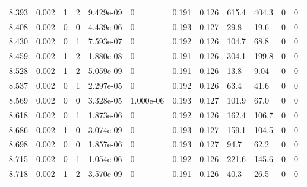 \documentclass[preview]{standalone}
\begin{document}
{{{{{{\begin{tabular}{L{1.2cm}C{1.2cm} C{0.3cm}C{0.5cm} C{1.4cm}C{1.4cm} C{1.4cm}C{1.4cm} C{1.6cm}C{1.6cm} C{1.6cm}C{1.6cm}}
  8.393  &  0.002  & 1     &  2 &  9.429e-09  & 0  &  0.191&   0.126& 615.4 & 404.3   &  0 & 0  \\ 
  8.408  &  0.002  & 0     &  0 &  4.439e-06  & 0  &  0.193&   0.127& 29.8 & 19.6   &  0 & 0  \\ 
  8.430  &  0.002  & 0     &  1 &  7.593e-07  & 0  &  0.192&   0.126& 104.7 & 68.8   &  0 & 0  \\ 
  8.459  &  0.002  & 1     &  2 &  1.880e-08  & 0  &  0.191&   0.126& 304.1 & 199.8   &  0 & 0  \\ 
  8.528  &  0.002  & 1     &  2 &  5.059e-09  & 0  &  0.191&   0.126& 13.8 & 9.04   &  0 & 0  \\ 
  8.537  &  0.002  & 0     &  1 &  2.297e-05  & 0  &  0.192&   0.126& 63.4 & 41.6   &  0 & 0  \\ 
  8.569  &  0.002  & 0     &  0 &  3.328e-05  & 1.000e-06  &  0.193&   0.127& 101.9 & 67.0   &  0 & 0  \\ 
  8.618  &  0.002  & 0     &  1 &  1.873e-06  & 0  &  0.192&   0.126& 162.4 & 106.7   &  0 & 0  \\ 
  8.686  &  0.002  & 1     &  0 &  3.074e-09  & 0  &  0.193&   0.127& 159.1 & 104.5   &  0 & 0  \\ 
  8.698  &  0.002  & 0     &  0 &  1.857e-06  & 0  &  0.193&   0.127& 94.7 & 62.2   &  0 & 0  \\ 
  8.715  &  0.002  & 0     &  1 &  1.054e-06  & 0  &  0.192&   0.126& 221.6 & 145.6   &  0 & 0  \\ 
  8.718  &  0.002  & 1     &  2 &  3.570e-09  & 0  &  0.191&   0.126& 40.3 & 26.5   &  0 & 0  \\ 
\hline 
\end{tabular} 

}}}}}}
\end{document}
